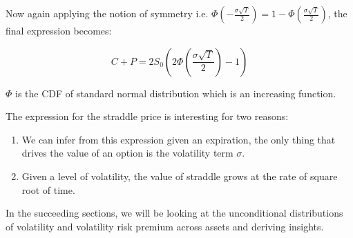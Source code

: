 Now again applying the notion of symmetry i.e. $\Phi\left( -\frac{\sigma \sqrt{T}}{2} \right) = 1 - \Phi\left( \frac{\sigma \sqrt{T}}{2} \right)$, the final expression becomes:

$$C + P = 2 S_0 \left( 2\Phi\left( \frac{\sigma \sqrt{T}}{2} \right) - 1 \right)$$

$\Phi$ is the CDF of standard normal distribution which is an increasing function. 

The expression for the straddle price is interesting for two reasons:
\begin{enumerate}
    \item We can infer from this expression given an expiration, the only thing that drives the value of an option is the volatility term $\sigma$. 
    \item Given a level of volatility, the value of straddle grows at the rate of square root of time.
\end{enumerate}

In the succeeding sections, we will be looking at the unconditional distributions of volatility and volatility risk premium across assets and deriving insights.